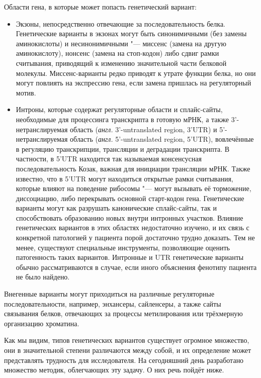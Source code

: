 \documentclass[a4paper,12pt]{article}
\begin{document}
Области гена, в которые может попасть генетический вариант:

\begin{itemize}
\item Экзоны, непосредственно отвечающие за последовательность белка.
Генетические варианты в экзонах могут быть синонимичными (без замены аминокислоты) и несинонимичными "--- миссенс (замена на другую аминокислоту), нонсенс (замена на стоп-кодон) либо сдвиг рамки считывания, приводящий к изменению значительной части белковой молекулы.
Миссенс-варианты редко приводят к утрате функции белка, но они могут повлиять на экспрессию гена, если замена пришлась на регуляторный мотив\cite{j_Brea_Fernandez_2011}.
\item Интроны, которые содержат регуляторные области и сплайс-сайты, необходимые для процессинга транскрипта в готовую мРНК, а также 3'-нетранслируемая область (\textit{англ.} 3'-untranslated region, 3'UTR) и 5'-нетранслируемая область (\textit{англ.} 5'-untranslated region, 5'UTR), вовлечённые в регуляцию транскрипции, трансляции и деградации транскрипта.
В частности, в 5'UTR находится так называемая консенсусная последовательность Козак, важная для инициации трансляции мРНК\cite{Kozak_1987}.
Также известно, что в 5'UTR могут находиться открытые рамки считывания, которые влияют на поведение рибосомы "--- могут вызывать её торможение, диссоциацию, либо перекрывать основной старт-кодон гена\cite{Young_2016}.
Генетические варианты могут как разрушать канонические сплайс-сайты, так и способствовать образованию новых внутри интронных участков\cite{Abramowicz_2018}.
Влияние генетических вариантов в этих областях недостаточно изучено, и их связь с конкретной патологией у пациента порой достаточно трудно доказать.
Тем не менее, существуют специальные инструменты, позволяющие оценить патогенность таких вариантов.
Интронные и UTR генетические варианты обычно рассматриваются в случае, если иного объяснения фенотипу пациента не было найдено.
\end{itemize}

Внегенные варианты могут приходиться на различные регуляторные последовательности, например, энхансеры, сайленсеры, а также сайты связывания белков, отвечающих за процессы метилирования или трёхмерную организацию хроматина.

Как мы видим, типов генетических вариантов существует огромное множество, они в значительной степени различаются между собой, и их определение может представлять трудность для исследователя.
На сегодняшний день разработано множество методик, облегчающих эту задачу.
О них речь пойдёт ниже.
\end{document}

